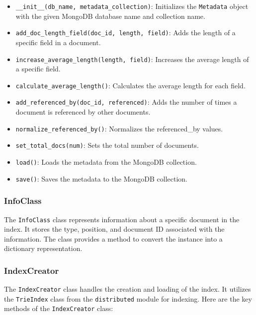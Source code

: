 \documentclass{article}
\begin{document}
\begin{itemize}
    \item \texttt{\_\_init\_\_(db\_name, metadata\_collection)}: 
    Initializes the \texttt{Metadata} object with the given MongoDB database name and collection name.
    \item \texttt{add\_doc\_length\_field(doc\_id, length, field)}: Adds the length of a 
    specific field in a document.
    \item \texttt{increase\_average\_length(length, field)}: Increases the average length of a 
    specific field.
    \item \texttt{calculate\_average\_length()}: Calculates the average length for each field.
    \item \texttt{add\_referenced\_by(doc\_id, referenced)}: Adds the number of times a document 
    is referenced by other documents.
    \item \texttt{normalize\_referenced\_by()}: Normalizes the referenced\_by values.
    \item \texttt{set\_total\_docs(num)}: Sets the total number of documents.
    \item \texttt{load()}: Loads the metadata from the MongoDB collection.
    \item \texttt{save()}: Saves the metadata to the MongoDB collection.
\end{itemize}

\subsubsection{InfoClass}

The \texttt{InfoClass} class represents information about a specific document in the index. It 
stores the type, position, and document ID associated with the information. The class provides a 
method to convert the instance into a dictionary representation.

\subsubsection{IndexCreator}

The \texttt{IndexCreator} class handles the creation and loading of the index. It utilizes the 
\texttt{TrieIndex} class from the \texttt{distributed} module for indexing. Here are the key 
methods of the \texttt{IndexCreator} class:
\end{document}
